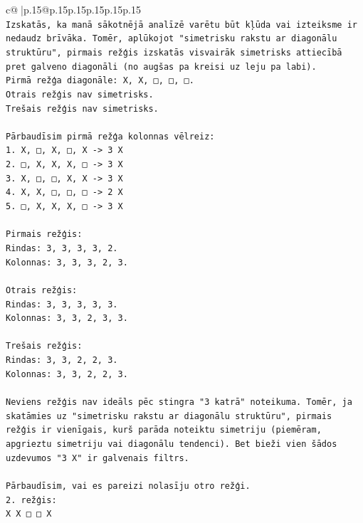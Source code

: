 \documentclass{article}
\begin{document}
{\begin{supertabular}{c@{$\;$}|p{.15\linewidth}@{}p{.15\linewidth}p{.15\linewidth}p{.15\linewidth}p{.15\linewidth}p{.15\linewidth}}
{{{\\ 
\texttt{Izskatās, ka manā sākotnējā analīzē varētu būt kļūda vai izteiksme ir nedaudz brīvāka. Tomēr, aplūkojot "simetrisku rakstu ar diagonālu struktūru", pirmais režģis izskatās visvairāk simetrisks attiecībā pret galveno diagonāli (no augšas pa kreisi uz leju pa labi).} \\
\texttt{Pirmā režģa diagonāle: X, X, □, □, □.} \\
\texttt{Otrais režģis nav simetrisks.} \\
\texttt{Trešais režģis nav simetrisks.} \\
\\ 
\texttt{Pārbaudīsim pirmā režģa kolonnas vēlreiz:} \\
\texttt{1. X, □, X, □, X {-}> 3 X} \\
\texttt{2. □, X, X, X, □ {-}> 3 X} \\
\texttt{3. X, □, □, X, X {-}> 3 X} \\
\texttt{4. X, X, □, □, □ {-}> 2 X} \\
\texttt{5. □, X, X, X, □ {-}> 3 X} \\
\\ 
\texttt{Pirmais režģis:} \\
\texttt{Rindas: 3, 3, 3, 3, 2.} \\
\texttt{Kolonnas: 3, 3, 3, 2, 3.} \\
\\ 
\texttt{Otrais režģis:} \\
\texttt{Rindas: 3, 3, 3, 3, 3.} \\
\texttt{Kolonnas: 3, 3, 2, 3, 3.} \\
\\ 
\texttt{Trešais režģis:} \\
\texttt{Rindas: 3, 3, 2, 2, 3.} \\
\texttt{Kolonnas: 3, 3, 2, 2, 3.} \\
\\ 
\texttt{Neviens režģis nav ideāls pēc stingra "3 katrā" noteikuma. Tomēr, ja skatāmies uz "simetrisku rakstu ar diagonālu struktūru", pirmais režģis ir vienīgais, kurš parāda noteiktu simetriju (piemēram, apgrieztu simetriju vai diagonālu tendenci). Bet bieži vien šādos uzdevumos "3 X" ir galvenais filtrs.} \\
\\ 
\texttt{Pārbaudīsim, vai es pareizi nolasīju otro režģi.} \\
\texttt{2. režģis:} \\
\texttt{X X □ □ X} \\
}}}
\end{supertabular}}
\end{document}
